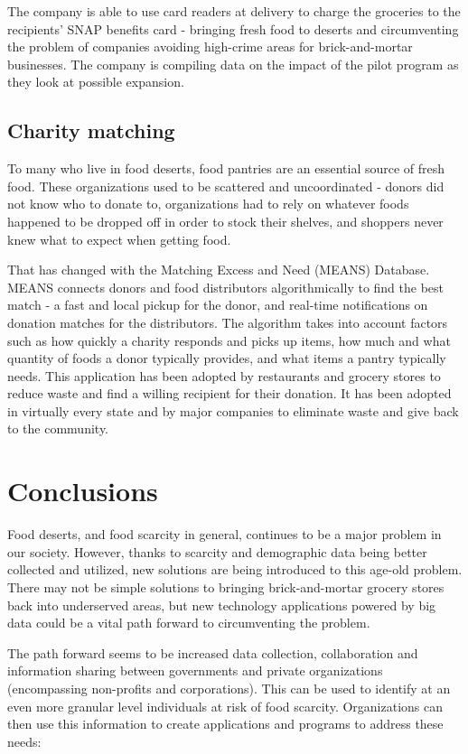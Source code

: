 \documentclass[sigconf]{acmart}
\begin{document}
The company is able to use card readers at delivery to charge the groceries to the recipients' SNAP benefits card - bringing fresh food to deserts and circumventing the problem of companies avoiding high-crime areas for brick-and-mortar businesses. The company is compiling data on the impact of the pilot program as they look at possible expansion.\cite{haddon_gasparro_2016}

\subsection{Charity matching}

To many who live in food deserts, food pantries are an essential source of fresh food. These organizations used to be scattered and uncoordinated - donors did not know who to donate to, organizations had to rely on whatever foods happened to be dropped off in order to stock their shelves, and shoppers never knew what to expect when getting food. 

That has changed with the Matching Excess and Need (MEANS) Database.\cite{center} MEANS connects donors and food distributors algorithmically to find the best match - a fast and local pickup for the donor, and real-time notifications on donation matches for the distributors. The algorithm takes into account factors such as how quickly a charity responds and picks up items, how much and what quantity of foods a donor typically provides, and what items a pantry typically needs.\cite{homemeans} This application has been adopted by restaurants and grocery stores to reduce waste and find a willing recipient for their donation. It has been adopted in virtually every state and by major companies to eliminate waste and give back to the community.

\section{Conclusions}

Food deserts, and food scarcity in general, continues to be a major problem in our society. However, thanks to scarcity and demographic data being better collected and utilized, new solutions are being introduced to this age-old problem. There may not be simple solutions to bringing brick-and-mortar grocery stores back into underserved areas, but new technology applications powered by big data could be a vital path forward to circumventing the problem. 

The path forward seems to be increased data collection, collaboration and information sharing between governments and private organizations (encompassing non-profits and corporations). This can be used to identify at an even more granular level individuals at risk of food scarcity. Organizations can then use this information to create applications and programs to address these needs: 
\end{document}
